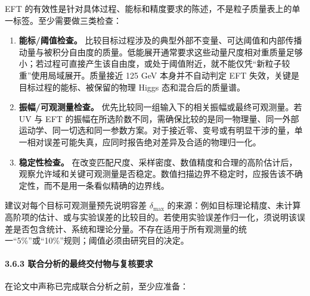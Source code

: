 \documentclass[
  chinese,
  UTF8]{ctexart}
\providecommand{\tightlist}{%
  \setlength{\itemsep}{0pt}\setlength{\parskip}{0pt}}
\begin{document}
EFT
的有效性是针对具体过程、能标和精度要求的陈述，不是粒子质量表上的单一标签。至少需要做三类检查：

\begin{enumerate}
\def\labelenumi{\arabic{enumi}.}
\tightlist
\item
  \textbf{能标/阈值检查。}
  比较目标过程涉及的典型外部不变量、可达阈值和内部传播动量与被积分自由度的质量。低能展开通常要求这些动量尺度相对重质量足够小；若过程可直接产生该自由度，或处于阈值附近，就不能仅凭``新粒子较重''使用局域展开。质量接近
  125 GeV 本身并不自动判定 EFT 失效，关键是目标过程的能标、被保留的物理
  Higgs 态和混合后的质量谱。
\item
  \textbf{振幅/可观测量检查。}
  优先比较同一组输入下的相关振幅或最终可观测量。若 UV 与 EFT
  的振幅在所选阶数不同，需确保比较的是同一物理量、同一外部运动学、同一切选和同一参数方案。对于接近零、变号或有明显干涉的量，单一相对误差可能失真，应同时报告绝对差异及合适的物理归一化。
\item
  \textbf{稳定性检查。}
  在改变匹配尺度、采样密度、数值精度和合理的高阶估计后，观察允许域和关键可观测量是否稳定。数值扫描边界不稳定时，应报告该不确定性，而不是用一条看似精确的边界线。
\end{enumerate}

建议对每个目标可观测量预先说明容差 \(\delta_{\max}\)
的来源：例如目标理论精度、未计算高阶项的估计、或与实验误差的比较目的。若使用实验误差作归一化，须说明该误差是否包含统计、系统和理论分量。不存在适用于所有观测量的统一``5\%''或``10\%''规则；阈值必须由研究目的决定。

\paragraph{3.6.3
联合分析的最终交付物与复核要求}\label{ux8054ux5408ux5206ux6790ux7684ux6700ux7ec8ux4ea4ux4ed8ux7269ux4e0eux590dux6838ux8981ux6c42}

在论文中声称已完成联合分析之前，至少应准备：
\end{document}
